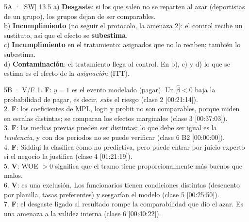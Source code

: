 \documentclass[11pt]{article}
\begin{document}
\begin{pauta}{5A · [SW] 13.5}
a) \textbf{Desgaste}: si los que salen no se reparten al azar (deportistas de un grupo), los grupos dejan de ser comparables.\\
b) \textbf{Incumplimiento} (no seguir el protocolo, la amenaza 2): el control recibe un sustituto, así que el efecto se \textbf{subestima}.\\
c) \textbf{Incumplimiento} en el tratamiento: asignados que no lo reciben; también lo subestima.\\
d) \textbf{Contaminación}: el tratamiento llega al control. En b), c) y d) lo que se estima es el efecto de la \emph{asignación} (ITT).
\end{pauta}

\begin{pauta}{5B · V/F}
1. \textbf{F}: $y=1$ es el evento modelado (pagar). Un $\hat\beta<0$ baja la probabilidad de pagar, es decir, \emph{sube} el riesgo (clase 2 [00:21:14]).\\
2. \textbf{F}: los coeficientes de MPL, logit y probit no son comparables, porque miden en escalas distintas; se comparan los efectos marginales (clase 3 [00:37:03]).\\
3. \textbf{F}: las medias previas pueden ser distintas; lo que debe ser igual es la \emph{tendencia}, y con dos periodos no se puede verificar (clase 6 B2 [00:00:00]).\\
4. \textbf{F}: Siddiqi la clasifica como no predictiva, pero puede entrar por juicio experto si el negocio la justifica (clase 4 [01:21:19]).\\
5. \textbf{V}: WOE $>0$ significa que el tramo tiene proporcionalmente más buenos que malos.\\
6. \textbf{V}: es una exclusión. Los funcionarios tienen condiciones distintas (descuento por planilla, tasas preferentes) y sesgarían el modelo (clase 5 [00:25:50]).\\
7. \textbf{F}: el desgaste ligado al resultado rompe la comparabilidad que dio el azar. Es una amenaza a la validez interna (clase 6 [00:40:22]).
\end{pauta}
\end{document}

